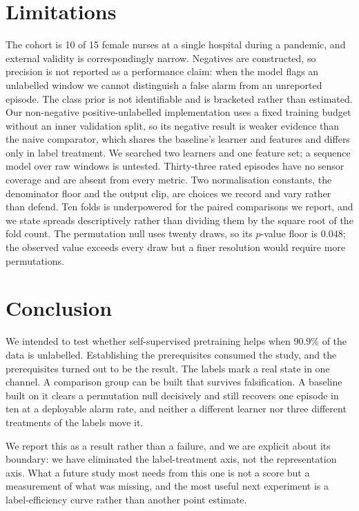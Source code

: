 \documentclass{article}
\begin{document}
\section{Limitations}

The cohort is 10 of 15 female nurses at a single hospital during a pandemic,
and external validity is correspondingly narrow. Negatives are constructed, so
precision is not reported as a performance claim: when the model flags an
unlabelled window we cannot distinguish a false alarm from an unreported
episode. The class prior is not identifiable and is bracketed rather than
estimated. Our non-negative positive-unlabelled implementation uses a fixed
training budget without an inner validation split, so its negative result is
weaker evidence than the naive comparator, which shares the baseline's learner
and features and differs only in label treatment. We searched two learners and
one feature set; a sequence model over raw windows is untested. Thirty-three
rated episodes have no sensor coverage and are absent from every metric. Two
normalisation constants, the denominator floor and the output clip, are choices
we record and vary rather than defend. Ten folds is underpowered for the paired
comparisons we report, and we state spreads descriptively rather than dividing
them by the square root of the fold count. The permutation null uses twenty
draws, so its $p$-value floor is $0.048$; the observed value exceeds every draw
but a finer resolution would require more permutations.

\section{Conclusion}

We intended to test whether self-supervised pretraining helps when
90.9\% of the data is unlabelled. Establishing the prerequisites
consumed the study, and the prerequisites turned out to be the result. The
labels mark a real state in one channel. A comparison group can be built that
survives falsification. A baseline built on it clears a permutation null
decisively and still recovers one episode in ten at a deployable alarm rate,
and neither a different learner nor three different treatments of the labels
move it.

We report this as a result rather than a failure, and we are explicit about its
boundary: we have eliminated the label-treatment axis, not the representation
axis. What a future study most needs from this one is not a score but a
measurement of what was missing, and the most useful next experiment is a
label-efficiency curve rather than another point estimate.
\end{document}
